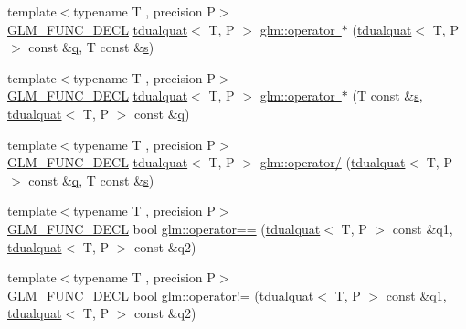 \begin{DoxyCompactItemize}
\item 
{\footnotesize template$<$typename T , precision P$>$ }\\\mbox{\hyperlink{setup_8hpp_ab2d052de21a70539923e9bcbf6e83a51}{G\+L\+M\+\_\+\+F\+U\+N\+C\+\_\+\+D\+E\+CL}} \mbox{\hyperlink{structglm_1_1tdualquat}{tdualquat}}$<$ T, P $>$ \mbox{\hyperlink{group__gtx__dual__quaternion_ga4a6cc7370cdc034ece6e7f948a67979b}{glm\+::operator $\ast$}} (\mbox{\hyperlink{structglm_1_1tdualquat}{tdualquat}}$<$ T, P $>$ const \&\mbox{\hyperlink{glad_8h_a514729309336df22bcc8eda979d6ced4}{q}}, T const \&\mbox{\hyperlink{glad_8h_af1b1d5edfea6a34daee7389b1b5810ad}{s}})
\item 
{\footnotesize template$<$typename T , precision P$>$ }\\\mbox{\hyperlink{setup_8hpp_ab2d052de21a70539923e9bcbf6e83a51}{G\+L\+M\+\_\+\+F\+U\+N\+C\+\_\+\+D\+E\+CL}} \mbox{\hyperlink{structglm_1_1tdualquat}{tdualquat}}$<$ T, P $>$ \mbox{\hyperlink{group__gtx__dual__quaternion_ga95c5286c40784455b0130b2880e99f72}{glm\+::operator $\ast$}} (T const \&\mbox{\hyperlink{glad_8h_af1b1d5edfea6a34daee7389b1b5810ad}{s}}, \mbox{\hyperlink{structglm_1_1tdualquat}{tdualquat}}$<$ T, P $>$ const \&\mbox{\hyperlink{glad_8h_a514729309336df22bcc8eda979d6ced4}{q}})
\item 
{\footnotesize template$<$typename T , precision P$>$ }\\\mbox{\hyperlink{setup_8hpp_ab2d052de21a70539923e9bcbf6e83a51}{G\+L\+M\+\_\+\+F\+U\+N\+C\+\_\+\+D\+E\+CL}} \mbox{\hyperlink{structglm_1_1tdualquat}{tdualquat}}$<$ T, P $>$ \mbox{\hyperlink{group__gtx__dual__quaternion_gad27b1d064624dd6ff1ecc205616323ba}{glm\+::operator/}} (\mbox{\hyperlink{structglm_1_1tdualquat}{tdualquat}}$<$ T, P $>$ const \&\mbox{\hyperlink{glad_8h_a514729309336df22bcc8eda979d6ced4}{q}}, T const \&\mbox{\hyperlink{glad_8h_af1b1d5edfea6a34daee7389b1b5810ad}{s}})
\item 
{\footnotesize template$<$typename T , precision P$>$ }\\\mbox{\hyperlink{setup_8hpp_ab2d052de21a70539923e9bcbf6e83a51}{G\+L\+M\+\_\+\+F\+U\+N\+C\+\_\+\+D\+E\+CL}} bool \mbox{\hyperlink{group__gtx__dual__quaternion_ga732a51a3a2029f72dd381210e76a3082}{glm\+::operator==}} (\mbox{\hyperlink{structglm_1_1tdualquat}{tdualquat}}$<$ T, P $>$ const \&q1, \mbox{\hyperlink{structglm_1_1tdualquat}{tdualquat}}$<$ T, P $>$ const \&q2)
\item 
{\footnotesize template$<$typename T , precision P$>$ }\\\mbox{\hyperlink{setup_8hpp_ab2d052de21a70539923e9bcbf6e83a51}{G\+L\+M\+\_\+\+F\+U\+N\+C\+\_\+\+D\+E\+CL}} bool \mbox{\hyperlink{group__gtx__dual__quaternion_ga5d256fb73497154924e2cf772411edef}{glm\+::operator!=}} (\mbox{\hyperlink{structglm_1_1tdualquat}{tdualquat}}$<$ T, P $>$ const \&q1, \mbox{\hyperlink{structglm_1_1tdualquat}{tdualquat}}$<$ T, P $>$ const \&q2)

\end{DoxyCompactItemize}
